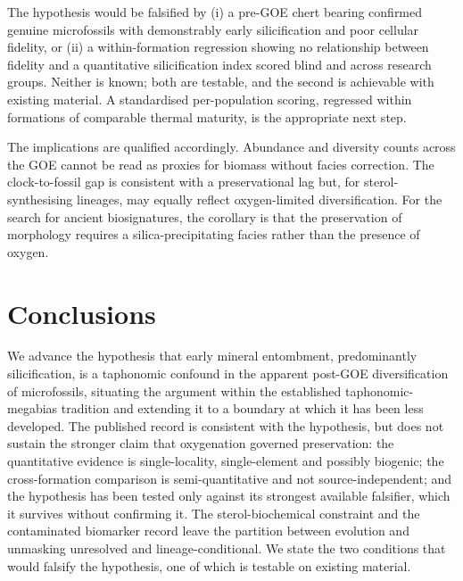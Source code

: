 \documentclass[11pt]{article}
\begin{document}
The hypothesis would be falsified by (i) a pre-GOE chert bearing confirmed genuine microfossils with
demonstrably early silicification and poor cellular fidelity, or (ii) a within-formation regression
showing no relationship between fidelity and a quantitative silicification index scored blind and
across research groups. Neither is known; both are testable, and the second is achievable with
existing material. A standardised per-population scoring, regressed within formations of comparable
thermal maturity, is the appropriate next step.

The implications are qualified accordingly. Abundance and diversity counts across the GOE cannot be
read as proxies for biomass without facies correction. The clock-to-fossil gap is consistent with a
preservational lag but, for sterol-synthesising lineages, may equally reflect oxygen-limited
diversification. For the search for ancient biosignatures, the corollary is that the preservation of
morphology requires a silica-precipitating facies rather than the presence of oxygen.

\section{Conclusions}

We advance the hypothesis that early mineral entombment, predominantly silicification, is a
taphonomic confound in the apparent post-GOE diversification of microfossils, situating the argument
within the established taphonomic-megabias tradition and extending it to a boundary at which it has
been less developed. The published record is consistent with the hypothesis, but does not sustain the
stronger claim that oxygenation governed preservation: the quantitative evidence is single-locality,
single-element and possibly biogenic; the cross-formation comparison is semi-quantitative and not
source-independent; and the hypothesis has been tested only against its strongest available
falsifier, which it survives without confirming it. The sterol-biochemical constraint and the
contaminated biomarker record leave the partition between evolution and unmasking unresolved and
lineage-conditional. We state the two conditions that would falsify the hypothesis, one of which is
testable on existing material.
\end{document}
